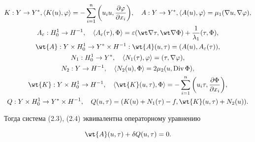 \begin{gather*}


K:Y\to Y^*,\langle K(u),\varphi\rangle=-\sum^n_{i=1}\bigg(u_i u,\frac


{\partial \varphi}{\partial x_i}\bigg),\quad


A:Y\to Y^*, \langle A(u), \varphi\rangle = \mu_1(\nabla u, \nabla


\varphi),\\


%


A_{\varepsilon}: H^1_0\to H^{-1},\quad \langle A_{\varepsilon}(\tau),


\Phi\rangle=\varepsilon(\wt \nabla\tau, \wt\nabla\Phi)+\frac


{1}{\lambda_1}(\tau, \Phi ),\\


%


\wt{A}:Y\times H^1_0\to Y^*\times H^{-1}:\wt{A}(u,\tau)=(


A(u), A_{\varepsilon}(\tau)),\\


%


N_1:H^1_0\to Y^*,\quad \langle N_1(\tau),\varphi\rangle =


(\tau, \nabla\varphi),\\


%


N_2:Y\to H^{-1},\quad \langle N_2(u), \Phi\rangle=2\mu_2(u, \Div \Phi),\\


%


\wt{K}:Y\times H^1_0\to H^{-1},\quad \langle \wt{K}(u,\tau),\Phi\rangle = -


\sum^n_{i=1}\bigg(u_i \tau, \frac {\partial \Phi}{\partial x_i}\bigg),\\


%


Q:Y\times H^1_0\to Y^*\times H^{-1},\quad


Q(u,\tau)=(K(u)+N_1(\tau)-f,\wt{K}(u,\tau)+N_2(u)).


\end{gather*}


Тогда система (2.3), (2.4) эквивалентна операторному уравнению


\begin{equation}


\wt{A}(u,\tau)+\delta Q(u, \tau)=0.


\end{equation}





